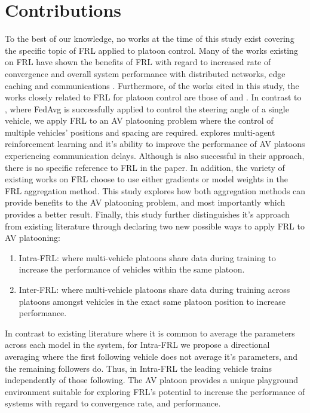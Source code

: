 \section{Contributions}
To the best of our knowledge, no works at the time of this study exist covering the 
specific topic of FRL applied to platoon control. Many of the works existing on FRL have shown the benefits of FRL with regard to increased rate of convergence and overall system performance with distributed networks, edge caching and communications \cite{ZhangX2020, LimHyun2021, WangXiaofei2021, Huang2021}.  Furthermore, of the works cited in this study, the works closely related to FRL for platoon control are those of \cite{Peake2020} and \cite{Liang2019}.  In contrast to \cite{Liang2019}, where FedAvg is successfully applied to control the steering angle of a single vehicle, we apply FRL to an AV platooning problem where the control of multiple vehicles' positions and spacing are required.  \cite{Peake2020} explores multi-agent reinforcement learning and it's ability to improve the performance of AV platoons experiencing communication delays.  Although \cite{Peake2020} is also successful in their approach, there is no specific reference to FRL in the paper. In addition, the variety of existing works on FRL choose to use either gradients or model weights in the FRL aggregation method.  This study explores how both aggregation methods can provide benefits to the AV platooning problem, and most importantly which provides a better result. Finally, this study further distinguishes it's approach from existing literature through declaring two new possible ways to apply FRL to AV platooning:

\begin{enumerate}
    \item Intra-FRL: where multi-vehicle platoons share data during training to increase 
    the performance of vehicles within the same platoon.
    \item Inter-FRL: where multi-vehicle platoons share data during training across 
    platoons amongst vehicles in the exact same platoon position to increase performance.
\end{enumerate}

In contrast to existing literature where it is common to average the parameters 
across each model in the system, for Intra-FRL we propose a directional averaging where 
the first following vehicle does not average it's parameters, and the remaining 
followers do. Thus, in Intra-FRL the leading vehicle trains independently of those 
following. The AV platoon provides a unique playground environment suitable for 
exploring FRL's potential to increase the performance of systems with regard to 
convergence rate, and performance.

